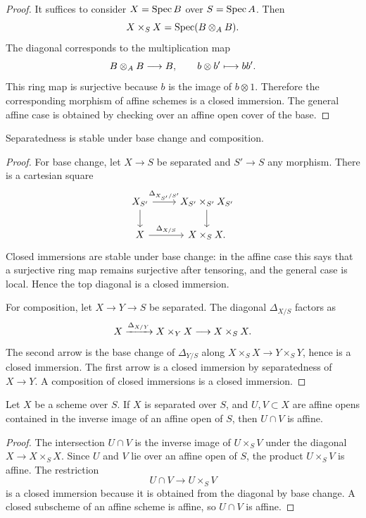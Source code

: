 \begin{proof}
It suffices to consider \(X=\operatorname{Spec} B\) over \(S=\operatorname{Spec} A\).  Then
\[
    X\times_S X=\operatorname{Spec}(B\otimes_A B).
\]
The diagonal corresponds to the multiplication map
\[
    B\otimes_A B\longrightarrow B,\qquad b\otimes b'\longmapsto bb'.
\]
This ring map is surjective because \(b\) is the image of \(b\otimes 1\).
Therefore the corresponding morphism of affine schemes is a closed immersion.
The general affine case is obtained by checking over an affine open cover of
the base.
\end{proof}

\begin{proposition}
Separatedness is stable under base change and composition.
\end{proposition}

\begin{proof}
For base change, let \(X\to S\) be separated and \(S'\to S\) any morphism.
There is a cartesian square
\[
\begin{tikzcd}
X_{S'} \arrow[r,"\Delta_{X_{S'}/S'}"] \arrow[d] &
X_{S'}\times_{S'}X_{S'} \arrow[d]\\
X \arrow[r,"\Delta_{X/S}"] & X\times_S X .
\end{tikzcd}
\]
Closed immersions are stable under base change: in the affine case this says
that a surjective ring map remains surjective after tensoring, and the general
case is local.  Hence the top diagonal is a closed immersion.

For composition, let \(X\to Y\to S\) be separated.  The diagonal
\(\Delta_{X/S}\) factors as
\[
    X \xrightarrow{\Delta_{X/Y}} X\times_Y X \longrightarrow X\times_S X.
\]
The second arrow is the base change of \(\Delta_{Y/S}\) along
\(X\times_S X\to Y\times_S Y\), hence is a closed immersion.  The first arrow
is a closed immersion by separatedness of \(X\to Y\).  A composition of closed
immersions is a closed immersion.
\end{proof}

\begin{proposition}
Let \(X\) be a scheme over \(S\).  If \(X\) is separated over \(S\), and
\(U,V\subset X\) are affine opens contained in the inverse image of an affine
open of \(S\), then \(U\cap V\) is affine.
\end{proposition}

\begin{proof}
The intersection \(U\cap V\) is the inverse image of \(U\times_S V\) under the
diagonal \(X\to X\times_S X\).  Since \(U\) and \(V\) lie over an affine open of
\(S\), the product \(U\times_S V\) is affine.  The restriction
\[
    U\cap V\longrightarrow U\times_S V
\]
is a closed immersion because it is obtained from the diagonal by base change.
A closed subscheme of an affine scheme is affine, so \(U\cap V\) is affine.
\end{proof}

